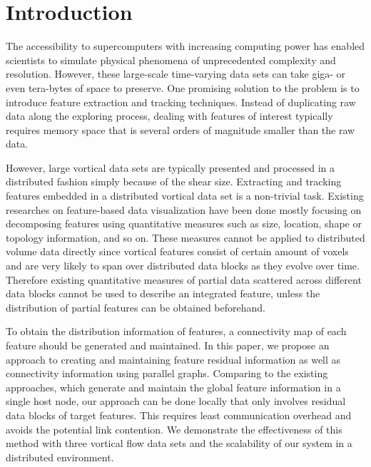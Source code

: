 \documentclass[10pt, conference, compsocconf]{IEEEtran}
\begin{document}
%
\IEEEpeerreviewmaketitle

\section{Introduction}
The accessibility to supercomputers with increasing computing power has enabled scientists to simulate physical phenomena of unprecedented complexity and resolution. However, these large-scale time-varying data sets can take giga- or even tera-bytes of space to preserve. One promising solution to the problem is to introduce feature extraction and tracking techniques. Instead of duplicating raw data along the exploring process, dealing with features of interest typically requires memory space that is several orders of magnitude smaller than the raw data.

However, large vortical data sets are typically presented and processed in a distributed fashion simply because of the shear size. Extracting and tracking features embedded in a distributed vortical data set is a non-trivial task. Existing researches on feature-based data visualization have been done mostly focusing on decomposing features using quantitative measures such as size, location, shape or topology information, and so on. These measures cannot be applied to distributed volume data directly since vortical features consist of certain amount of voxels and are very likely to span over distributed data blocks as they evolve over time. Therefore existing quantitative measures of partial data scattered across different data blocks cannot be used to describe an integrated feature, unless the distribution of partial features can be obtained beforehand.

To obtain the distribution information of features, a connectivity map of each feature should be generated and maintained. In this paper, we propose an approach to creating and maintaining feature residual information as well as connectivity information using parallel graphs. Comparing to the existing approaches, which generate and maintain the global feature information in a single host node, our approach can be done locally that only involves residual data blocks of target features. This requires least communication overhead and avoids the potential link contention. We demonstrate the effectiveness of this method with three vortical flow data sets and the scalability of our system in a distributed environment.
\end{document}
